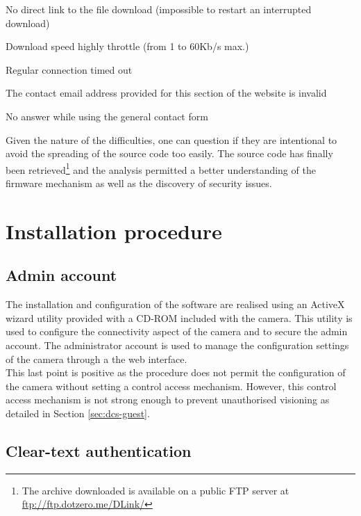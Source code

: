 \begin{itemizealt}
\item No direct link to the file download (impossible to restart an interrupted download)
\item Download speed highly throttle (from 1 to 60Kb/s max.)
\item Regular connection timed out
\item The contact email address provided for this section of the website is invalid
\item No answer while using the general contact form
\end{itemizealt}

Given the nature of the difficulties, one can question if they are intentional to avoid the spreading of the source code too easily.
The source code has finally been retrieved\footnote{The archive downloaded is available on a public FTP server at \url{ftp://ftp.dotzero.me/DLink/}} and the analysis permitted a better understanding of the firmware mechanism as well as the discovery of security issues.

\section{Installation procedure}
\label{sec:dcs-install}

\subsection{Admin account}

The installation and configuration of the software are realised using an ActiveX wizard utility provided with a CD-ROM included with the camera.
This utility is used to configure the connectivity aspect of the camera and to secure the admin account.
The administrator account is used to manage the configuration settings of the camera through a the web interface.\\

This last point is positive as the procedure does not permit the configuration of the camera without setting a control access mechanism.
However, this control access mechanism is not strong enough to prevent unauthorised visioning as detailed in Section \ref{sec:dcs-guest}.

\subsection{Clear-text authentication}
\label{sec:dcs-clearauth}

